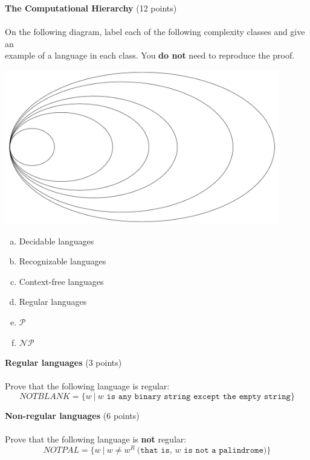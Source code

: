 \documentclass[12pt]{article}
\newenvironment{question}[2][Question]{\begin{trivlist}
\item[\hskip \labelsep {\bfseries #1}\hskip \labelsep {\bfseries #2.}]}{\end{trivlist}}
\begin{document}
\begin{question}{1}\textbf{The Computational Hierarchy} (12 points)\\\\
On the following diagram, label each of the following complexity classes and give an\\example of a language in each class. You \textbf{do not} need to reproduce the proof.
\begin{center}
\includegraphics[width=0.9\textwidth]{diagram.pdf}
\end{center}
\begin{enumerate}[(a)]
	\setlength{\itemsep}{2em}
	\item Decidable languages
	\item Recognizable languages
	\item Context-free languages
	\item Regular languages
	\item $\mathcal{P}$
	\item $\mathcal{NP}$
\end{enumerate}
\end{question}
\clearpage

\begin{question}{2}\textbf{Regular languages} (3 points) \\\\
Prove that the following language is regular: \[NOTBLANK = \{w \ | \ w \texttt{ is any binary string except the empty string}\}\]
\end{question}
\clearpage


\begin{question}{3}\textbf{Non-regular languages} (6 points)\\\\
Prove that the following language is \textbf{not} regular: \[NOTPAL = \{w \ | \ w \not = w^R \ \texttt{(that is, } w \texttt{ is not a palindrome)}\}\]
\end{question}
\end{document}
